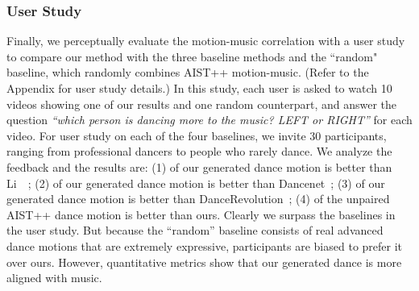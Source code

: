 \vspace{-3mm}
\subsubsection{User Study}
\label{sec:user_study}
Finally, we perceptually evaluate the motion-music correlation with a user study to compare our method with the three baseline methods and the ``random" baseline, which randomly combines AIST++ motion-music. (Refer to the Appendix for user study details.)
In this study, each user is asked to watch 10 videos showing one of our results and one random counterpart, and answer the question \emph{``which person is dancing more to the music? LEFT or RIGHT''} for each video. 
For user study on each of the four baselines, we invite 30 participants, ranging from professional dancers to people who rarely dance. 
We analyze the feedback and the results are: (1)  of our generated dance motion is better than Li~\etal~\cite{li2020learning}; (2)  of our generated dance motion is better than Dancenet~\cite{zhuang2020music2dance}; {(3)  of our generated dance motion is better than DanceRevolution~\cite{huang2021}; }(4)  of the unpaired AIST++ dance motion is better than ours. 
Clearly we surpass the baselines in the user study. 
But because the ``random'' baseline consists of real advanced dance motions that are extremely expressive, participants are biased to prefer it over ours. 
However, quantitative metrics show that our generated dance is more aligned with music.

\begin{table}[t]
\vspace{-5mm}
\midsepdefault
\caption{{\textbf{Ablation Study on Cross-modal Fusion.} Early fusion of the two modalities allows the model to generate motion sequences align better with the conditioning music. *Note this number is calculated using the music paired with the input motion.}}
\label{tab:exp_crossmodal}
\vspace{-2mm}
\end{table} 